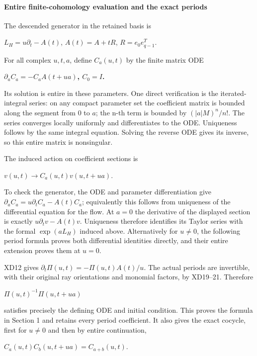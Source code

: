 \documentclass{article}
\begin{document}
\paragraph{Entire finite-cohomology evaluation and the exact periods}\label{endpoint-f1_scaling--entire-finite-cohomology-evaluation-and-the-exact-periods}

The descended generator in the retained basis is

\(L_H=u \partial_t-A(t)\), \(A(t)=A+tR\), \(R=e_0 e_{q-1}^T\).

For all complex \(u,t,a\), define \(C_a(u,t)\) by the finite matrix ODE

\textbf{\(\partial_a C_a=-C_a A(t+ua)\), \(C_0=I\).}

Its solution is entire in these parameters. One direct verification is the iterated-integral series: on any compact parameter set the coefficient matrix is bounded along the segment from \(0\) to \(a\); the n-th term is bounded by \((|a|M)^n/n!\). The series converges locally uniformly and differentiates to the ODE. Uniqueness follows by the same integral equation. Solving the reverse ODE gives its inverse, so this entire matrix is nonsingular.

The induced action on coefficient sections is

\(v(u,t) \to  C_a(u,t) v(u,t+ua)\).

To check the generator, the ODE and parameter differentiation give \(\partial_a C_a=u \partial_t C_a-A(t)C_a\); equivalently this follows from uniqueness of the differential equation for the flow. At \(a=0\) the derivative of the displayed section is exactly \(u \partial_t v-A(t)v\). Uniqueness therefore identifies its Taylor series with the formal \(\exp(aL_H)\) induced above. Alternatively for \(u\ne 0\), the following period formula proves both differential identities directly, and their entire extension proves them at \(u=0\).

XD12 gives \(\partial_t \Pi(u,t)=-\Pi(u,t)A(t)/u\). The actual periods are invertible, with their original ray orientations and monomial factors, by XD19--21. Therefore

\(\Pi(u,t)^{-1}\Pi(u,t+ua)\)

satisfies precisely the defining ODE and initial condition. This proves the formula in Section 1 and retains every period coefficient. It also gives the exact cocycle, first for \(u\ne 0\) and then by entire continuation,

\(C_a(u,t) C_b(u,t+ua)=C_{a+b}(u,t)\).
\end{document}
